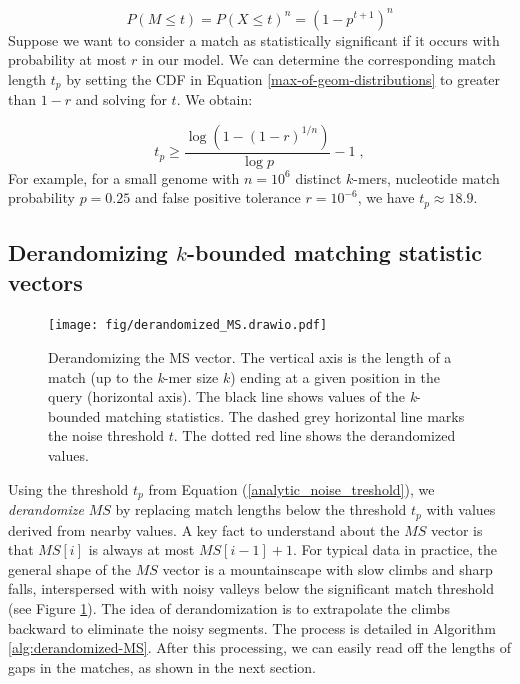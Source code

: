 \documentclass[unnumsec,webpdf,modern,large]{biorxiv}%
\theoremstyle{thmstyleone}%
\theoremstyle{thmstyletwo}%
\theoremstyle{thmstylethree}%
\begin{document}
\begin{equation}
    P\left(M \leq t\right) = P\left(X \leq t\right)^n = \left(1 - p^{t + 1}\right)^n
\label{max-of-geom-distributions}    
\end{equation}
Suppose we want to consider a match as statistically significant if it occurs with probability at most $r$ in our model. We can determine the corresponding match length $t_p$ by setting the CDF in Equation \ref{max-of-geom-distributions} to greater than $1-r$ and solving for $t$. We obtain:

\begin{equation}\label{analytic_noise_treshold}
t_p \geq \frac{\log (1 - (1-r)^{1/n})}{\log p} - 1\;,
\end{equation}
For example, for a small genome with $n = 10^6$ distinct $k$-mers,  nucleotide match probability $p = 0.25$ and false positive tolerance $r = 10^{-6}$, we have $t_p \approx 18.9$.

\subsection{\texorpdfstring{Derandomizing $k$-bounded matching statistic vectors}{Derandomizing k-bounded matching statistic vectors}}


\begin{figure}[b]
    \centering
    \texttt{[image: fig/derandomized\_MS.drawio.pdf]}
    \caption{Derandomizing the MS vector. The vertical axis is the length of a match (up to the \emph{k}-mer size $k$) ending at a given position in the query (horizontal axis). The black line shows values of the \textit{k}-bounded matching statistics. The dashed grey horizontal line marks the noise threshold $t$. The dotted red line shows the derandomized values.}
    \label{fig:derandomization}
\end{figure}
Using the threshold $t_p$ from Equation (\ref{analytic_noise_treshold}), we \emph{derandomize} $MS$ by replacing match lengths below the threshold $t_p$ with values derived from nearby values. A key fact to understand about the $MS$ vector is that $MS[i]$ is always at most $MS[i-1]+1$. For typical data in practice, the general shape of the $MS$ vector is a mountainscape with slow climbs and sharp falls, interspersed with with noisy valleys below the significant match threshold (see Figure \ref{fig:derandomization}). The idea of derandomization is to extrapolate the climbs backward to eliminate the noisy segments. The process is detailed in Algorithm \ref{alg:derandomized-MS}. After this processing, we can easily read off the lengths of gaps in the matches, as shown in the next section.
\end{document}
